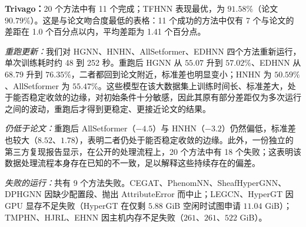 \documentclass[11pt,a4paper]{article}
\begin{document}
\par\smallskip
\noindent\textbf{Trivago：}20 个方法中有 11 个完成；TFHNN 表现最优，为 $91.58\%$（论文 $90.79\%$）。这是与论文吻合度最低的表格：11 个成功的方法中仅有 7 个与论文的差距在 1.0 个百分点以内，平均差距为 1.41 个百分点。

\noindent\textit{重跑更新：}我们对 HGNN、HNHN、AllSetformer、EDHNN 四个方法重新运行，单次训练耗时约 48 到 252 秒。重跑后 HGNN 从 $55.07$ 升到 $57.02\%$、EDHNN 从 $68.79$ 升到 $76.35\%$，二者都回到论文附近，标准差也明显变小；HNHN 为 $50.59\%$、AllSetformer 为 $55.47\%$。这些模型在该大数据集上训练时间长、标准差大，处于能否稳定收敛的边缘，对初始条件十分敏感，因此其原有部分差距仅为多次运行之间的波动，重跑后才得到更稳定、更接近论文的结果。

\noindent\textit{仍低于论文：}重跑后 AllSetformer（$-4.5$）与 HNHN（$-3.2$）仍然偏低，标准差也较大（$8.52$、$1.78$），表明二者仍处于能否稳定收敛的边缘。此外，一份独立的第三方复现报告显示，在公开的处理流程上，20 个方法中有 18 个失败；这表明该数据处理流程本身存在已知的不一致，足以解释这些持续存在的偏差。

\noindent\textit{失败的运行：}共有 9 个方法失败。CEGAT、PhenomNN、SheafHyperGNN、DPHGNN 因缺少配置段、抛出 AttributeError 而中止；LEGCN、HyperGT 因 GPU 显存不足失败（HyperGT 在仅剩 $5.88$ GiB 空闲时试图申请 $11.04$ GiB）；TMPHN、HJRL、EHNN 因主机内存不足失败（$261$、$261$、$522$ GiB）。
\end{document}
